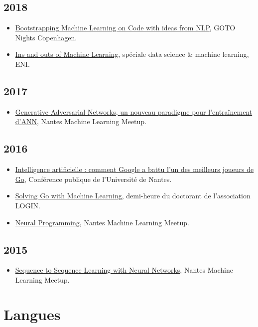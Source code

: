 \documentclass[11pt,a4paper]{moderncv}
\begin{document}
\subsection{2018}

\begin{itemize}
\item
  \href{https://www.meetup.com/GOTO-Nights-CPH/events/256342503/}{Bootstrapping
    Machine Learning on Code with ideas from NLP}, GOTO Nights
  Copenhagen.
\item
  \href{https://www.mapado.com/nantes/la-matinale-de-la-data-science-et-du-machine-learning}{Ins
    and outs of Machine Learning}, spéciale data science \& machine learning, ENI.
\end{itemize}

\subsection{2017}

\begin{itemize}
\item
  \href{https://www.meetup.com/Nantes-Machine-Learning-Meetup/events/239481485/}%
  {Generative Adversarial Networks, un nouveau paradigme pour l'entraînement d'ANN},
  Nantes Machine Learning Meetup.
\end{itemize}

\subsection{2016}

\begin{itemize}
\item \href{https://youtu.be/xv2S8A1EPqI}{Intelligence artificielle : comment Google a
  battu l'un des meilleurs joueurs de Go}, Conférence publique de l'Université de Nantes.
\item \href{https://youtu.be/KuvXb2nILLc}{Solving Go with Machine
    Learning}, demi-heure du doctorant de l'association LOGIN.
\item
  \href{https://www.meetup.com/Nantes-Machine-Learning-Meetup/events/226648150/}{Neural
    Programming}, Nantes Machine Learning Meetup.
\end{itemize}

\subsection{2015}

\begin{itemize}
\item
  \href{https://www.meetup.com/Nantes-Machine-Learning-Meetup/events/221108033/}{Sequence
    to Sequence Learning with Neural Networks}, Nantes
  Machine Learning Meetup.
\end{itemize}

\section{Langues}
\end{document}
